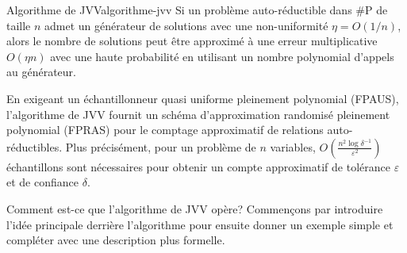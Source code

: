 \begin{maintheorem}{Algorithme de JVV}{algorithme-jvv}
    Si un problème auto-réductible dans \textsf{\#P} de taille $n$ admet un générateur de solutions avec une non-uniformité $\eta = O(1 / n)$, alors le nombre de solutions peut être approximé à une erreur multiplicative $O(\eta n)$ avec une haute probabilité en utilisant un nombre polynomial d'appels au générateur.
\end{maintheorem}

En exigeant un échantillonneur quasi uniforme pleinement polynomial (FPAUS), l'algorithme de JVV fournit un schéma d'approximation randomisé pleinement polynomial (FPRAS) pour le comptage approximatif de relations auto-réductibles. Plus précisément, pour un problème de $n$ variables, $O(\frac{n^{2} \log \delta^{-1}}{\varepsilon^{2}})$ échantillons sont nécessaires pour obtenir un compte approximatif de tolérance $\varepsilon$ et de confiance $\delta$.

Comment est-ce que l'algorithme de JVV opère? Commençons par introduire l'idée principale derrière l'algorithme pour ensuite donner un exemple simple et compléter avec une description plus formelle. 

